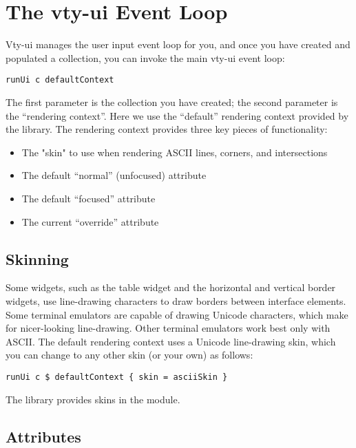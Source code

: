 \section{The vty-ui Event Loop}
\label{sec:event_loop}

Vty-ui manages the user input event loop for you, and once you have
created and populated a collection, you can invoke the main vty-ui event
loop:

\begin{verbatim}
runUi c defaultContext
\end{verbatim}

The first parameter is the collection you have created; the second
parameter is the ``rendering context''.  Here we use the ``default''
rendering context provided by the library.  The rendering context
provides three key pieces of functionality:

\begin{itemize}
\item The "skin" to use when rendering ASCII lines, corners, and
      intersections
\item The default ``normal'' (unfocused) attribute
\item The default ``focused'' attribute
\item The current ``override'' attribute
\end{itemize}

\subsection{Skinning}

Some widgets, such as the table widget and the horizontal and vertical
border widgets, use line-drawing characters to draw borders between
interface elements.  Some terminal emulators are capable of drawing
Unicode characters, which make for nicer-looking line-drawing.  Other
terminal emulators work best only with ASCII.  The default rendering
context uses a Unicode line-drawing skin, which you can change to any
other skin (or your own) as follows:

\begin{verbatim}
runUi c $ defaultContext { skin = asciiSkin }
\end{verbatim}

The library provides skins in the  module.

\subsection{Attributes}
\label{sec:attributes}

